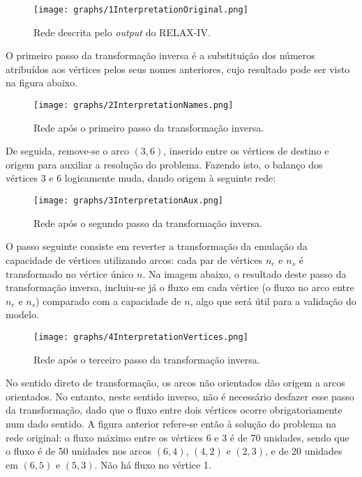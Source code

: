 \documentclass[12pt, a4paper, titlepage]{article}
\begin{document}
\begin{figure}[H]
    \centering
    \texttt{[image: graphs/1InterpretationOriginal.png]}
    \caption{Rede descrita pelo \emph{output} do RELAX-IV.}
    \label{1interpretation-graph}
\end{figure}

O primeiro passo da transformação inversa é a substituição dos números atribuídos aos vértices pelos
seus nomes anteriores, cujo resultado pode ser visto na figura abaixo.

\begin{figure}[H]
    \centering
    \texttt{[image: graphs/2InterpretationNames.png]}
    \caption{Rede após o primeiro passo da transformação inversa.}
    \label{2interpretation-graph}
\end{figure}

De seguida, remove-se o arco $(3, 6)$, inserido entre os vértices de destino e origem para auxiliar
a resolução do problema. Fazendo isto, o balanço dos vértices 3 e 6 logicamente muda, dando origem
à seguinte rede:

\begin{figure}[H]
    \centering
    \texttt{[image: graphs/3InterpretationAux.png]}
    \caption{Rede após o segundo passo da transformação inversa.}
    \label{3interpretation-graph}
\end{figure}

O passo seguinte consiste em reverter a transformação da emulação da capacidade de vértices
utilizando arcos: cada par de vértices $n_e$ e $n_s$ é transformado no vértice único $n$. Na imagem
abaixo, o resultado deste passo da transformação inversa, incluiu-se já o fluxo em cada vértice (o
fluxo no arco entre $n_e$ e $n_s$) comparado com a capacidade de $n$, algo que será útil para a
validação do modelo.

\begin{figure}[H]
    \centering
    \texttt{[image: graphs/4InterpretationVertices.png]}
    \caption{Rede após o terceiro passo da transformação inversa.}
    \label{4interpretation-graph}
\end{figure}

No sentido direto de transformação, os arcos não orientados dão origem a arcos orientados. No
entanto, neste sentido inverso, não é necessário desfazer esse passo da transformação, dado que o
fluxo entre dois vértices ocorre obrigatoriamente num dado sentido. A figura anterior refere-se
então à solução do problema na rede original: o fluxo máximo entre os vértices 6 e 3 é de 70
unidades, sendo que o fluxo é de 50 unidades nos arcos $(6, 4)$, $(4, 2)$ e $(2, 3)$, e de 20
unidades em $(6, 5)$ e $(5, 3)$. Não há fluxo no vértice 1.
\end{document}
